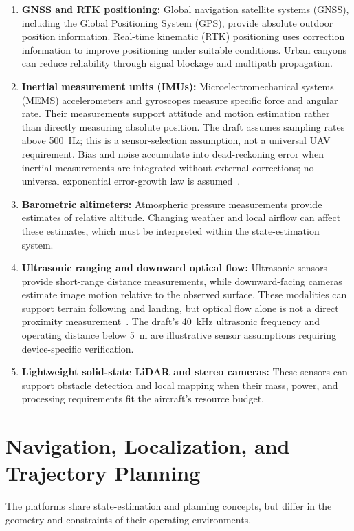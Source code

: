 \documentclass[11pt,a4paper]{article}
\begin{document}
\begin{enumerate}
    \item \textbf{GNSS and RTK positioning:}
    Global navigation satellite systems (GNSS), including the Global Positioning System (GPS), provide absolute outdoor position information. Real-time kinematic (RTK) positioning uses correction information to improve positioning under suitable conditions. Urban canyons can reduce reliability through signal blockage and multipath propagation.

    \item \textbf{Inertial measurement units (IMUs):}
    Microelectromechanical systems (MEMS) accelerometers and gyroscopes measure specific force and angular rate. Their measurements support attitude and motion estimation rather than directly measuring absolute position. The draft assumes sampling rates above \SI{500}{\hertz}; this is a sensor-selection assumption, not a universal UAV requirement. Bias and noise accumulate into dead-reckoning error when inertial measurements are integrated without external corrections; no universal exponential error-growth law is assumed~\cite{woodman2007}.

    \item \textbf{Barometric altimeters:}
    Atmospheric pressure measurements provide estimates of relative altitude. Changing weather and local airflow can affect these estimates, which must be interpreted within the state-estimation system.

    \item \textbf{Ultrasonic ranging and downward optical flow:}
    Ultrasonic sensors provide short-range distance measurements, while downward-facing cameras estimate image motion relative to the observed surface. These modalities can support terrain following and landing, but optical flow alone is not a direct proximity measurement~\cite{chang2023}. The draft's \SI{40}{\kilo\hertz} ultrasonic frequency and operating distance below \SI{5}{\metre} are illustrative sensor assumptions requiring device-specific verification.

    \item \textbf{Lightweight solid-state LiDAR and stereo cameras:}
    These sensors can support obstacle detection and local mapping when their mass, power, and processing requirements fit the aircraft's resource budget.
\end{enumerate}

\section{Navigation, Localization, and Trajectory Planning}
The platforms share state-estimation and planning concepts, but differ in the geometry and constraints of their operating environments.
\end{document}
